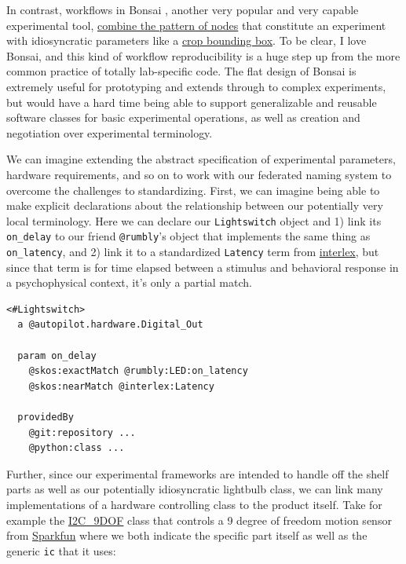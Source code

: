 \documentclass[notoc]{tufte-book}
\begin{document}
In contrast, workflows in Bonsai \citep{lopesBonsaiEventbasedFramework2015a, lopesNewOpenSourceTools2021} ,
another very popular and very capable experimental tool,
\href{https://github.com/bonsai-rx/bonsai-examples/blob/cbc2c1decc11e1dc1df920421ef88a16fd2e184c/RoiTrigger/RoiTrigger.bonsai}{combine
the pattern of nodes} that constitute an experiment with idiosyncratic
parameters like a
\href{https://github.com/bonsai-rx/bonsai-examples/blob/cbc2c1decc11e1dc1df920421ef88a16fd2e184c/RoiTrigger/RoiTrigger.bonsai\#L76-L85}{crop
bounding box}. To be clear, I love Bonsai, and this kind of workflow
reproducibility is a huge step up from the more common practice of
totally lab-specific code. The flat design of Bonsai is extremely useful
for prototyping and extends through to complex experiments, but would
have a hard time being able to support generalizable and reusable
software classes for basic experimental operations, as well as creation
and negotiation over experimental terminology.

We can imagine extending the abstract specification of experimental
parameters, hardware requirements, and so on to work with our federated
naming system to overcome the challenges to standardizing. First, we can
imagine being able to make explicit declarations about the relationship
between our potentially very local terminology. Here we can declare our
\texttt{Lightswitch} object and 1) link its \texttt{on\_delay} to our
friend \texttt{@rumbly}'s object that implements the same thing as
\texttt{on\_latency}, and 2) link it to a standardized \texttt{Latency}
term from
\href{https://scicrunch.org/scicrunch/interlex/view/ilx_0106040\#annotations}{interlex},
but since that term is for time elapsed between a stimulus and
behavioral response in a psychophysical context, it's only a partial
match.

\begin{verbatim}
<#Lightswitch>
  a @autopilot.hardware.Digital_Out

  param on_delay
    @skos:exactMatch @rumbly:LED:on_latency
    @skos:nearMatch @interlex:Latency

  providedBy
    @git:repository ...
    @python:class ...
\end{verbatim}

Further, since our experimental frameworks are intended to handle off
the shelf parts as well as our potentially idiosyncratic lightbulb
class, we can link many implementations of a hardware controlling class
to the product itself. Take for example the
\href{https://docs.auto-pi-lot.com/en/latest/hardware/i2c.html\#autopilot.hardware.i2c.I2C_9DOF}{I2C\_9DOF}
class that controls a 9 degree of freedom motion sensor from
\href{https://www.sparkfun.com/products/13944}{Sparkfun} where we both
indicate the specific part itself as well as the generic \texttt{ic}
that it uses:
\end{document}
